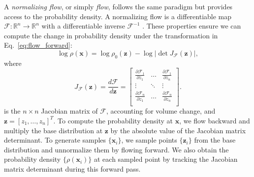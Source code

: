 \documentclass[%
    reprint,
    twocolumn,
    nofootinbib,
    amsmath,
    amssymb,
    aps,
    prstab,
]{revtex4-2}
\newcommand{\vect}[1]{\boldsymbol{\mathbf{#1}}}
\begin{document}
A \textit{normalizing flow}, or simply \textit{flow}, follows the same paradigm but provides access to the probability density. A normalizing flow is a differentiable map $\mathcal{F}: \mathbb{R}^n \rightarrow \mathbb{R}^n$ with a differentiable inverse $\mathcal{F}^{-1}$ \cite{Papamakarios_2021}. These properties ensure we can compute the change in probability density under the transformation in Eq.~\eqref{eq:flow_forward}:
%
\begin{equation} \label{eq:flow_change_of_variables}
    \log{\rho(\vect{x})} = \log{\rho_0(\vect{z})} - \log{\left| {\det J_{\mathcal{F}}(\vect{z})} \right|},
\end{equation}
%
where
%
\begin{equation} \label{eq:flow_jacobian}
    J_{\mathcal{F}}(\vect{z}) = 
    \frac{d\mathcal{F}}{d\vect{z}} = 
    \begin{bmatrix}
        \frac{\partial{\mathcal{F}_1}}{\partial{z_1}} & \dots &  \frac{\partial{\mathcal{F}_1}}{\partial{z_n}} \\
        \vdots & \ddots & \vdots \\
        \frac{\partial{\mathcal{F}_n}}{\partial{z_1}} & \dots &  \frac{\partial{\mathcal{F}_n}}{\partial{z_n}} \\
    \end{bmatrix}.
\end{equation}
%
is the $n \times n$ Jacobian matrix of $\mathcal{F}$, accounting for volume change, and $\vect{z} = [z_1, \dots , z_n]^T$. To compute the probability density at $\vect{x}$, we flow backward and multiply the base distribution at $\vect{z}$ by the absolute value of the Jacobian matrix determinant. To generate samples $\{ \vect{x}_i \}$, we sample points $\{ \vect{z}_i \}$ from the base distribution and unnormalize them by flowing forward. We also obtain the probability density $ \{\rho(\vect{x}_i) \}$ at each sampled point by tracking the Jacobian matrix determinant during this forward pass.
\end{document}
